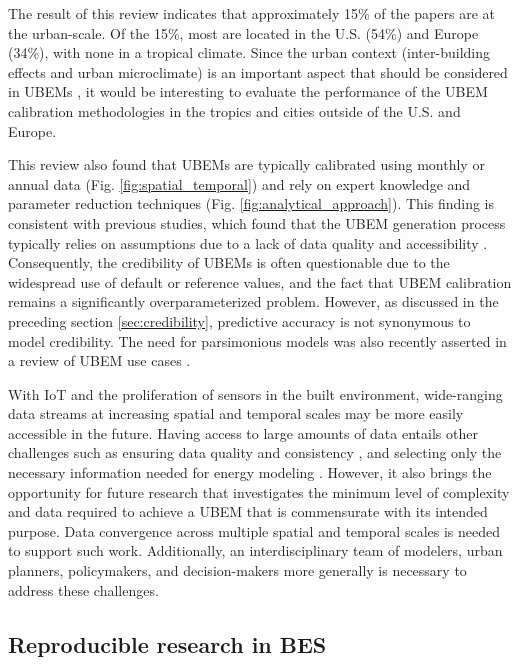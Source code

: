 \documentclass[review]{elsarticle}
\begin{document}
The result of this review indicates that approximately 15\% of the papers are at the urban-scale. Of the 15\%, most are located in the U.S. (54\%) and Europe (34\%), with none in a tropical climate. Since the urban context (inter-building effects and urban microclimate) is an important aspect that should be considered in UBEMs \cite{hong2020ten, miller2018urban}, it would be interesting to evaluate the performance of the UBEM calibration methodologies in the tropics and cities outside of the U.S. and Europe. 

This review also found that UBEMs are typically calibrated using monthly or annual data (Fig. \ref{fig:spatial_temporal}) and rely on expert knowledge and parameter reduction techniques (Fig. \ref{fig:analytical_approach}). This finding is consistent with previous studies, which found that the UBEM generation process typically relies on assumptions due to a lack of data quality and accessibility \cite{chen2019development, reinhart2016urban}. Consequently, the credibility of UBEMs is often questionable due to the widespread use of default or reference values, and the fact that UBEM calibration remains a significantly overparameterized problem. However, as discussed in the preceding section \ref{sec:credibility}, predictive accuracy is not synonymous to model credibility. The need for parsimonious models was also recently asserted in a review of UBEM use cases \cite{ang2020concept}.

With IoT and the proliferation of sensors in the built environment, wide-ranging data streams at increasing spatial and temporal scales may be more easily accessible in the future. Having access to large amounts of data entails other challenges such as ensuring data quality and consistency \cite{noardo2020tools, chen2019development}, and selecting only the necessary information needed for energy modeling \cite{biljecki2021extending}. However, it also brings the opportunity for future research that investigates the minimum level of complexity and data required to achieve a UBEM that is commensurate with its intended purpose. Data convergence across multiple spatial and temporal scales is needed to support such work. Additionally, an interdisciplinary team of modelers, urban planners, policymakers, and decision-makers more generally is necessary to address these challenges.

\subsection{Reproducible research in BES} \label{sec:reproduce}
\end{document}
